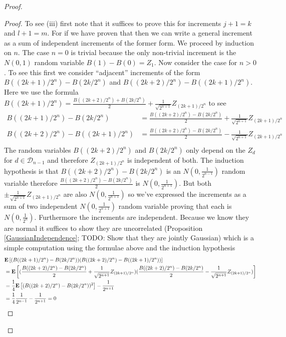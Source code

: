 \begin{proof}
\begin{proof}
To see (iii) first note that it suffices to prove this for increments $j+1=k$ and
$l+1=m$.  For if we have proven that then we can write a general
increment as a sum of independent increments of the former form.  
We proceed by induction on $n$.  The case $n=0$ is trivial
because the only non-trivial increment is the $N(0,1)$ random variable
$B(1) - B(0) = Z_1$.  Now consider the case for $n > 0$.  
To see this first we consider ``adjacent'' increments of the form
$B((2k+1)/2^n) - B(2k/2^n)$ and $B((2k+2)/2^n) - B((2k+1)/2^n)$.  Here
we use the formula $B((2k+1)/2^n) = \frac{B((2k+2)/2^n) +
  B(2k/2^n)}{2} + \frac{1}{\sqrt{2^{n+1}}} Z_{(2k+1)/2^n}$ to see 
\begin{align*}
B((2k+1)/2^n) - B(2k/2^n) &= \frac{B((2k+2)/2^n) -
  B(2k/2^n)}{2} + \frac{1}{\sqrt{2^{n+1}}} Z_{(2k+1)/2^n} \\
B((2k+2)/2^n) - B((2k+1)/2^n) &= \frac{B((2k+2)/2^n) -
  B(2k/2^n)}{2} - \frac{1}{\sqrt{2^{n+1}}} Z_{(2k+1)/2^n} \\
\end{align*}
The random variables $B((2k+2)/2^n)$ and $B(2k/2^n)$ only depend on
the $Z_d$ for $d \in \mathcal{D}_{n-1}$ and therefore $Z_{(2k+1)/2^n}$ is
independent of both.  The induction hypothesis is that $B((2k+2)/2^n) -
  B(2k/2^n)$ is an $N(0, \frac{1}{2^{n-1}})$ random variable therefore $ \frac{B((2k+2)/2^n) -
  B(2k/2^n)}{2}$ is $N(0, \frac{1}{2^{n+1}})$.  But both $\pm
\frac{1}{\sqrt{2^{n+1}}} Z_{(2k+1)/2^n}$ are also $N(0,
\frac{1}{2^{n+1}})$ so we've expressed the increments as a sum of two independent
$N(0, \frac{1}{2^{n+1}})$ random variable proving that each is $N(0,
\frac{1}{2^n})$.  Furthermore the increments are independent.  Because
we know they are normal it suffices to show they are uncorrelated
(Proposition \ref{GaussianIndependence}; TODO: Show that they are
jointly Gaussian)
which is a simple computation using the formulae above and the induction hypothesis
\begin{align*}
&\textbf{E}\left[(B((2k+1)/2^n) - B(2k/2^n))(B((2k+2)/2^n) -
  B((2k+1)/2^n))\right] \\
&= \textbf{E}\left[(\frac{B((2k+2)/2^n) -
  B(2k/2^n)}{2} + \frac{1}{\sqrt{2^{n+1}}} Z_{(2k+1)/2^n} ) (\frac{B((2k+2)/2^n) -
  B(2k/2^n)}{2} - \frac{1}{\sqrt{2^{n+1}}} Z_{(2k+1)/2^n})\right] \\
&=\frac{1}{4}\textbf{E}\left[(B((2k+2)/2^n) -  B(2k/2^n))^2\right] -
\frac{1}{2^{n+1}} \\
&=\frac{1}{4}\frac{1}{2^{n-1}} -  \frac{1}{2^{n+1}}  = 0
\end{align*}


\end{proof}
\end{proof}
